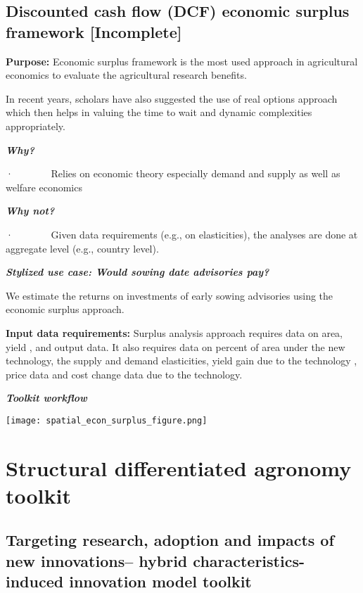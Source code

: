 \documentclass[
  letterpaper,
  DIV=11,
  numbers=noendperiod]{scrreprt}
\begin{document}
\section{Discounted cash flow (DCF) economic surplus framework
{[}Incomplete{]}}\label{discounted-cash-flow-dcf-economic-surplus-framework-incomplete}

\textbf{Purpose:} Economic surplus framework is the most used approach
in agricultural economics to evaluate the agricultural research
benefits.

In recent years, scholars have also suggested the use of real options
approach which then helps in valuing the time to wait and dynamic
complexities appropriately.

\textbf{\emph{Why?}}

·~~~~~~~ Relies on economic theory especially demand and supply as well
as welfare economics

\textbf{\emph{Why not?}}

·~~~~~~~ Given data requirements (e.g., on elasticities), the analyses
are done at aggregate level (e.g., country level).

\textbf{\emph{Stylized use case: Would sowing date advisories pay?}}

We estimate the returns on investments of early sowing advisories using
the economic surplus approach.

\textbf{Input data requirements:} Surplus analysis approach requires
data on area, yield , and output data. It also requires data on percent
of area under the new technology, the supply and demand elasticities,
yield gain due to the technology , price data and cost change data due
to the technology.

\textbf{\emph{Toolkit workflow}}

\texttt{[image: spatial\_econ\_surplus\_figure.png]}


\chapter{Structural differentiated agronomy
toolkit}\label{structural-differentiated-agronomy-toolkit}

\section{Targeting research, adoption and impacts of new innovations--
hybrid characteristics-induced innovation model
toolkit}\label{targeting-research-adoption-and-impacts-of-new-innovations-hybrid-characteristics-induced-innovation-model-toolkit}
\end{document}
